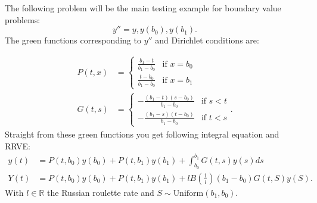 \documentclass[a4paper,12pt]{article}
\begin{document}
\begin{example}[Dirichlet $y''=y$] \label{main dirichlet}
    The following problem will be the main testing example for
    boundary value problems:
    \begin{equation} \label{eq:main dirichlet}
        y''=y, y(b_{0}),y(b_{1}).
    \end{equation}
    The green functions corresponding to $y''$ and Dirichlet conditions are:

    \begin{align}
        P(t,x) & = \begin{cases}
                       \frac{b_{1}-t}{b_{1}-b_{0}} & \text{if } x = b_{0} \\
                       \frac{t-b_{0}}{b_{1}-b_{0}} & \text{if } x = b_{1}
                   \end{cases}       \\
        G(t,s) & = \begin{cases}
                       -\frac{(b_{1}-t)(s-b_{0})}{b_{1}-b_{0}} & \text{if } s<t \\
                       -\frac{(b_{1}-s)(t-b_{0})}{b_{1}-b_{0}} & \text{if } t<s
                   \end{cases}.
    \end{align}
    Straight from these green functions you get following integral equation and RRVE:
    \begin{align} \label{inteq:main dirichlet}
        y(t) & = P(t,b_{0}) y(b_{0}) + P(t,b_{1}) y(b_{1}) + \int_{b_{0}}^{b_{1}} G(t,s)y(s) ds \\
        Y(t) & = P(t,b_{0}) y(b_{0}) + P(t,b_{1}) y(b_{1})
        + l B\left(\frac{1}{l} \right)(b_{1}-b_{0}) G(t,S)y(S) . \label{RRVE:main dirichlet}
    \end{align}
    With $l \in \mathbb{R}$ the Russian roulette rate and $S \sim \text{Uniform}(b_{1},b_{0})$.

\end{example}




\end{document}
